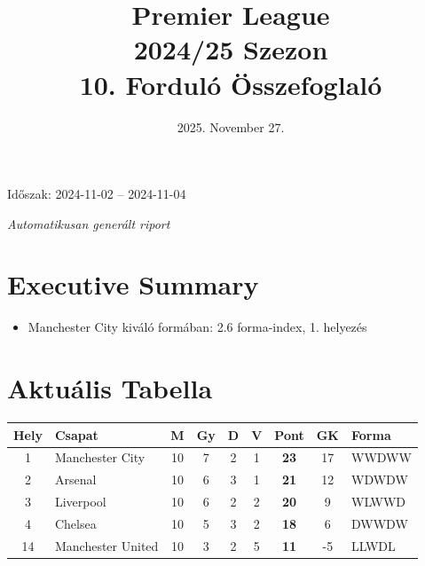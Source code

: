 \documentclass[11pt,a4paper]{article}
\title{
    \Huge \textbf{Premier League} \\
    \Large 2024/25 Szezon \\
    \large 10. Forduló Összefoglaló
}
\author{}
\date{2025. November 27.}
\begin{document}
\maketitle
\thispagestyle{empty}

\begin{center}
\Large Időszak: 2024-11-02 -- 2024-11-04
\end{center}

\vfill

\begin{center}
\textit{Automatikusan generált riport}
\end{center}

\newpage

\section*{Executive Summary}

\begin{tcolorbox}[colback=blue!5,colframe=blue!40,title=Főbb Insights]
\begin{itemize}
    \item Manchester City kiváló formában: 2.6 forma-index, 1. helyezés
\end{itemize}
\end{tcolorbox}

\vspace{1em}

\section*{Aktuális Tabella}

\begin{longtable}{clccccccl}
\toprule
\textbf{Hely} & \textbf{Csapat} & \textbf{M} & \textbf{Gy} & \textbf{D} & \textbf{V} & \textbf{Pont} & \textbf{GK} & \textbf{Forma} \\
\midrule
\endhead

        \rowcolor{green!30}
    1 & 
    Manchester City & 
    10 & 
    7 & 
    2 & 
    1 & 
    \textbf{23} & 
    17 & 
    WWDWW \\
        \rowcolor{green!30}
    2 & 
    Arsenal & 
    10 & 
    6 & 
    3 & 
    1 & 
    \textbf{21} & 
    12 & 
    WDWDW \\
        \rowcolor{green!30}
    3 & 
    Liverpool & 
    10 & 
    6 & 
    2 & 
    2 & 
    \textbf{20} & 
    9 & 
    WLWWD \\
        \rowcolor{green!30}
    4 & 
    Chelsea & 
    10 & 
    5 & 
    3 & 
    2 & 
    \textbf{18} & 
    6 & 
    DWWDW \\
    14 & 
    Manchester United & 
    10 & 
    3 & 
    2 & 
    5 & 
    \textbf{11} & 
    -5 & 
    LLWDL \\
\bottomrule
\end{longtable}
\end{document}

